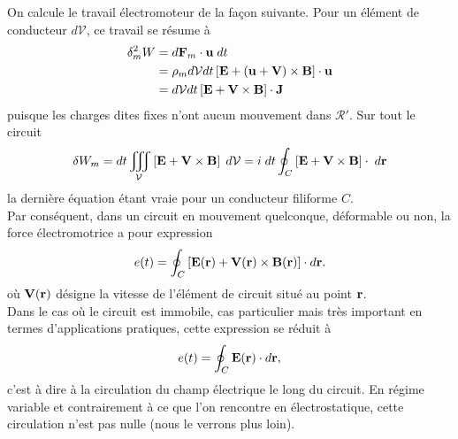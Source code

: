 \documentclass[11pt,a4paper]{report}
\begin{document}
On calcule le travail électromoteur de la façon suivante. Pour un élément de conducteur $d\mathcal{V}$, ce travail se résume à
\begin{align}
	\delta^2_m W & = d\bold{F}_m \cdot \bold{u}\;dt\\
			   & = \rho_m d\mathcal{V} dt \left[\bold{E}+\left(\bold{u}+\bold{V}\right)\times\bold{B} \right]\cdot \bold{u}\\
			   & = d\mathcal{V} dt \left[\bold{E}+ \bold{V}\times\bold{B}\right]\cdot \bold{J}
\end{align}
puisque les charges dites fixes n'ont aucun mouvement dans $\mathcal{R}'$. Sur tout le circuit 
\begin{equation}
	\delta W_m  = dt \iiint_\mathcal{V} \left[\bold{E} + \bold{V}\times\bold{B}\right] \;d\mathcal{V}
			    = i\;dt \oint_C \left[\bold{E} +  \bold{V}\times\bold{B}\right]\cdot\;d\bold{r}
\end{equation}
la dernière équation étant vraie pour un conducteur filiforme $C$.\\

Par conséquent, dans un circuit en mouvement quelconque, déformable ou non, la force électromotrice a pour expression
\begin{equation}
	e(t) = \oint_C\left[\bold{E}(\bold{r}) + \bold{V}(\bold{r})\times\bold{B}(\bold{r})\right]\cdot d\bold{r}.
\end{equation}
où $\bold{V}(\bold{r})$ désigne la vitesse de l'élément de circuit situé au point $\bold{r}$.\\

Dans le cas où le circuit est immobile, cas particulier mais très important en termes d'applications pratiques, cette expression se réduit à
\begin{equation}
	e(t) = \oint_C \bold{E}(\bold{r})\cdot d\bold{r},
\end{equation}
c'est à dire à la circulation du champ électrique le long du circuit. En régime variable et contrairement à ce que l'on rencontre en électrostatique, cette circulation n'est pas nulle (nous le verrons plus loin).\\
\end{document}
